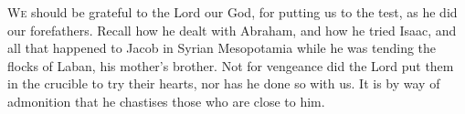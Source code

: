 
\lettrine{W}{e} should be grateful to the Lord our God, for putting us to the test, as he did our forefathers. Recall how he dealt with Abraham, and how he tried Isaac, and all that happened to Jacob in Syrian Mesopotamia while he was tending the flocks of Laban, his mother’s brother. Not for vengeance did the Lord put them in the crucible to try their hearts, nor has he done so with us. It is by way of admonition that he chastises those who are close to him.